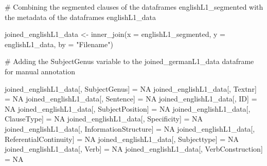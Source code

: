 \documentclass[
  letterpaper,
  DIV=11,
  numbers=noendperiod]{scrartcl}
\newenvironment{Shaded}{\begin{snugshade}}{\end{snugshade}}
\newcommand{\AttributeTok}[1]{\textcolor[rgb]{0.40,0.45,0.13}{#1}}
\newcommand{\CommentTok}[1]{\textcolor[rgb]{0.37,0.37,0.37}{#1}}
\newcommand{\ConstantTok}[1]{\textcolor[rgb]{0.56,0.35,0.01}{#1}}
\newcommand{\FunctionTok}[1]{\textcolor[rgb]{0.28,0.35,0.67}{#1}}
\newcommand{\NormalTok}[1]{\textcolor[rgb]{0.00,0.23,0.31}{#1}}
\newcommand{\OtherTok}[1]{\textcolor[rgb]{0.00,0.23,0.31}{#1}}
\newcommand{\StringTok}[1]{\textcolor[rgb]{0.13,0.47,0.30}{#1}}
\begin{document}
\begin{Shaded}
\begin{Highlighting}[]
\CommentTok{\# Combining the segmented clauses of the dataframes \textquotesingle{}englishL1\_segmented\textquotesingle{} with the metadata of the dataframes \textquotesingle{}englishL1\_data\textquotesingle{}}

\NormalTok{joined\_englishL1\_data }\OtherTok{\textless{}{-}} \FunctionTok{inner\_join}\NormalTok{(}\AttributeTok{x =}\NormalTok{ englishL1\_segmented, }\AttributeTok{y =}\NormalTok{ englishL1\_data, }\AttributeTok{by =} \StringTok{"Filename"}\NormalTok{)}

\CommentTok{\# Adding the \textquotesingle{}SubjectGenus\textquotesingle{} variable to the \textquotesingle{}joined\_germanL1\_data\textquotesingle{} dataframe for manual annotation}

\NormalTok{joined\_englishL1\_data[, }\StringTok{\textquotesingle{}SubjectGenus\textquotesingle{}}\NormalTok{] }\OtherTok{=} \ConstantTok{NA}
\NormalTok{joined\_englishL1\_data[, }\StringTok{\textquotesingle{}Textnr\textquotesingle{}}\NormalTok{] }\OtherTok{=} \ConstantTok{NA}
\NormalTok{joined\_englishL1\_data[, }\StringTok{\textquotesingle{}Sentence\textquotesingle{}}\NormalTok{] }\OtherTok{=} \ConstantTok{NA}
\NormalTok{joined\_englishL1\_data[, }\StringTok{\textquotesingle{}ID\textquotesingle{}}\NormalTok{] }\OtherTok{=} \ConstantTok{NA}
\NormalTok{joined\_englishL1\_data[, }\StringTok{\textquotesingle{}SubjectPosition\textquotesingle{}}\NormalTok{] }\OtherTok{=} \ConstantTok{NA}
\NormalTok{joined\_englishL1\_data[, }\StringTok{\textquotesingle{}ClauseType\textquotesingle{}}\NormalTok{] }\OtherTok{=} \ConstantTok{NA}
\NormalTok{joined\_englishL1\_data[, }\StringTok{\textquotesingle{}Specificity\textquotesingle{}}\NormalTok{] }\OtherTok{=} \ConstantTok{NA}
\NormalTok{joined\_englishL1\_data[, }\StringTok{\textquotesingle{}InformationStructure\textquotesingle{}}\NormalTok{] }\OtherTok{=} \ConstantTok{NA}
\NormalTok{joined\_englishL1\_data[, }\StringTok{\textquotesingle{}ReferentialContinuity\textquotesingle{}}\NormalTok{] }\OtherTok{=} \ConstantTok{NA}
\NormalTok{joined\_englishL1\_data[, }\StringTok{\textquotesingle{}Subjecttype\textquotesingle{}}\NormalTok{] }\OtherTok{=} \ConstantTok{NA}
\NormalTok{joined\_englishL1\_data[, }\StringTok{\textquotesingle{}Verb\textquotesingle{}}\NormalTok{] }\OtherTok{=} \ConstantTok{NA}
\NormalTok{joined\_englishL1\_data[, }\StringTok{\textquotesingle{}VerbConstruction\textquotesingle{}}\NormalTok{] }\OtherTok{=} \ConstantTok{NA}
\end{Highlighting}
\end{Shaded}
\end{document}
